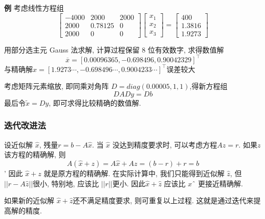 \documentclass[12pt,a4paper]{article}
\begin{document}
\begin{framed}
	{\bfseries 例} 考虑线性方程组
	\begin{equation}
	\left[\begin{array}{ccc}{-4000} & {2000} & {2000} \\ {2000} & {0.78125} & {0} \\ {2000} & {0} & {0}\end{array}\right]\left[\begin{array}{l}{x_{1}} \\ {x_{2}} \\ {x_{3}}\end{array}\right]=\left[\begin{array}{c}{400} \\ {1.3816} \\ {1.9273}\end{array}\right]
	\end{equation}
	
	用部分选主元 Gauss 法求解, 计算过程保留 8 位有效数字, 求得数值解
	\begin{equation}
	\overline{x}=[0.00096365,-0.698496,0.90042329]^{\top}
	\end{equation}
	与精确解$x=[1.9273 \cdots,-0.698496 \cdots, 0.9004233 \cdots]^{\top}$误差较大
	
	考虑矩阵元素缩放, 即同乘对角阵  $D = diag(0.00005, 1, 1)$,得新方程组
	\begin{equation}
	D A D y=D b
	\end{equation}
	最后令$\tilde{x}=D y$, 即可求得比较精确的数值解.
\end{framed}

\subsubsection{迭代改进法}
设近似解 $\hat{x}$, 残量$ r = b − A\hat{x}$. 当 $\hat{x}$ 没达到精度要求时, 可以考虑方程$Az = r$. 如果$ z $该方程的精确解, 则
\begin{equation}
A(\hat{x}+z)=A \hat{x}+A z=(b-r)+r=b
\end{equation}'
因此 $\hat{x} + z$ 就是原方程的精确解. 在实际计算中, 我们只能得到近似解 $\hat{z}$,
但 $||r-A\hat{z}||$很小, 特别地, 应该比 $||r||$更小. 因此$ \hat{x} + \hat{z}$ 应该比 $xˆ$ 更接近精确解.

如果新的近似解 $\hat{x} + \hat{z} $还不满足精度要求, 则可重复以上过程.
这就是通过迭代来提高解的精度.
\end{document}
